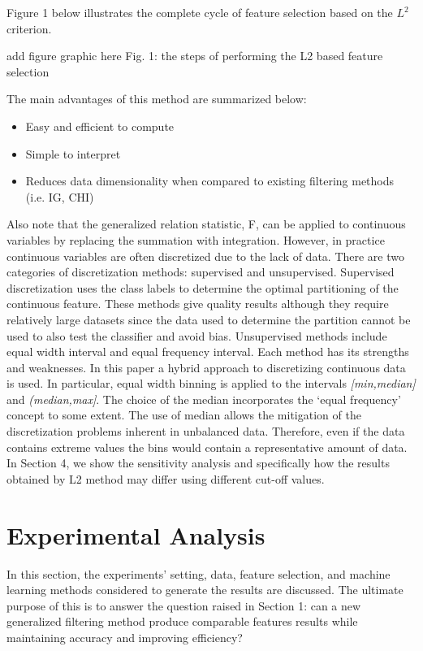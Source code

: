 \documentclass[review]{elsarticle}
\begin{document}
Figure 1 below illustrates the complete cycle of feature selection based on the $ L^2 $ criterion.\newline

add figure graphic here \newline
 Fig. 1: the steps of performing the L2 based feature selection 

The main advantages of this method are summarized below:
\begin{itemize}
	\item Easy and efficient to compute
	\item Simple to interpret 
	\item Reduces data dimensionality when compared to existing filtering methods (i.e. IG, CHI)
\end{itemize}


Also note that the generalized relation statistic, F, can be applied to continuous variables by replacing the summation with integration. However, in practice continuous variables are often discretized due to the lack of data. There are two categories of discretization methods: supervised and unsupervised. Supervised discretization uses the class labels to determine the optimal partitioning of the continuous feature. These methods give quality results although they require relatively large datasets since the data used to determine the partition cannot be used to also test the classifier and avoid bias. Unsupervised methods include equal width interval and equal frequency interval. Each method has its strengths and weaknesses. In this paper a hybrid approach to discretizing continuous data is used. In particular, equal width binning is applied to the intervals \textit{[min,median]} and \textit{(median,max]}. The choice of the median incorporates the ‘equal frequency’ concept to some extent. The use of median allows the mitigation of the discretization problems inherent in unbalanced data. Therefore, even if the data contains extreme values the bins would contain a representative amount of data. In Section 4, we show the sensitivity analysis and specifically how the results obtained by L2 method may differ using different cut-off values.

\section{Experimental Analysis }

In this section, the experiments’ setting, data, feature selection, and machine learning methods considered to generate the results are discussed. The ultimate purpose of this is to answer the question raised in Section 1: can a new generalized filtering method produce comparable features results while maintaining accuracy and improving efficiency?
\end{document}
